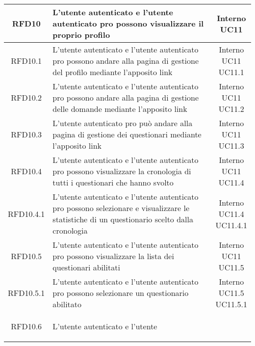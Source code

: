 \begin{longtable}{|c|>{\centering}m{7cm}|c|}
			 \hypertarget{{RFD10}}{{RFD10}} & L’utente autenticato e l’utente
autenticato pro possono visualizzare il
proprio profilo & \makecell{Interno\\ UC11 } \\ \hline
			 \hypertarget{{RFD10.1}}{{RFD10.1}} & L’utente autenticato e l’utente
autenticato pro possono andare alla
pagina di gestione del profilo mediante
l’apposito link & \makecell{Interno\\ UC11 \\UC11.1 } \\ \hline
			 \hypertarget{{RFD10.2}}{{RFD10.2}} & L’utente autenticato e l’utente
autenticato pro possono andare alla
pagina di gestione delle domande
mediante l’apposito link & \makecell{Interno\\ UC11 \\UC11.2 } \\ \hline
			 \hypertarget{{RFD10.3}}{{RFD10.3}} & L’utente autenticato pro può andare alla
pagina di gestione dei questionari
mediante l’apposito link & \makecell{Interno\\ UC11 \\UC11.3 } \\ \hline
			 \hypertarget{{RFD10.4}}{{RFD10.4}} & L’utente autenticato e l’utente
autenticato pro possono visualizzare la
cronologia di tutti i questionari che
hanno svolto & \makecell{Interno\\ UC11 \\UC11.4 } \\ \hline
			 \hypertarget{{RFD10.4.1}}{{RFD10.4.1}} & L’utente autenticato e l’utente
autenticato pro possono selezionare e
visualizzare le statistiche di un
questionario scelto dalla cronologia & \makecell{Interno\\ UC11.4 \\UC11.4.1 } \\ \hline
			 \hypertarget{{RFD10.5}}{{RFD10.5}} & L’utente autenticato e l’utente
autenticato pro possono visualizzare la
lista dei questionari abilitati & \makecell{Interno\\ UC11 \\UC11.5 } \\ \hline
			 \hypertarget{{RFD10.5.1}}{{RFD10.5.1}} & L’utente autenticato e l’utente
autenticato pro possono selezionare un
questionario abilitato & \makecell{Interno\\ UC11.5 \\UC11.5.1 } \\ \hline
			 \hypertarget{{RFD10.6}}{{RFD10.6}} & L’utente autenticato e l’utente

\end{longtable}
